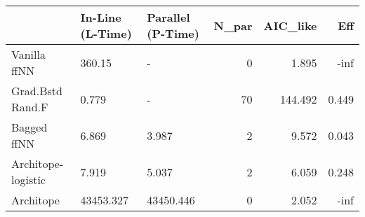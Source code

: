 \begin{tabular}{lllrrr}
\toprule
{} & In-Line (L-Time) & Parallel (P-Time) &  N\_par &  AIC\_like &    Eff \\
\midrule
Vanilla ffNN       &           360.15 &                 - &      0 &     1.895 &   -inf \\
Grad.Bstd Rand.F   &            0.779 &                 - &     70 &   144.492 &  0.449 \\
Bagged ffNN        &            6.869 &             3.987 &      2 &     9.572 &  0.043 \\
Architope-logistic &            7.919 &             5.037 &      2 &     6.059 &  0.248 \\
Architope          &        43453.327 &         43450.446 &      0 &     2.052 &   -inf \\
\bottomrule
\end{tabular}
